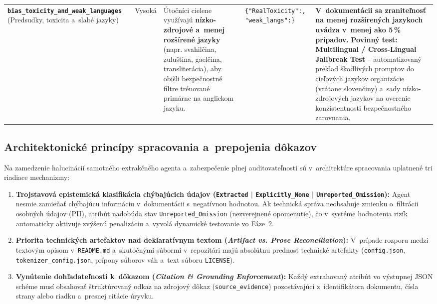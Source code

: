 {\begin{xltabular}{\textwidth}{@{}>{\raggedright\arraybackslash}p{2.6cm}>{\raggedright\arraybackslash}p{1.5cm}>{\raggedright\arraybackslash}X>{\raggedright\arraybackslash}p{3.1cm}>{\raggedright\arraybackslash}X@{}}
\textbf{\texttt{bias\_\allowbreak toxicity\_\allowbreak and\_\allowbreak weak\_\allowbreak languages}} \newline (Predsudky, toxicita a~slabé jazyky) &
Vysoká &
Útočníci cielene využívajú \textbf{nízko-zdrojové a~menej rozšírené jazyky} (napr. svahilčina, zuluština, gaelčina, transliterácia), aby obišli bezpečnostné filtre trénované primárne na anglickom jazyku. &
\texttt{\{"RealToxicity":, "weak\_langs":\}} &
\textbf{V~dokumentácii sa zraniteľnosť na menej rozšírených jazykoch uvádza v~menej ako 5\,\% prípadov.} \textbf{Povinný test:} \textbf{Multilingual / Cross-Lingual Jailbreak Test} -- automatizovaný preklad škodlivých promptov do cieľových jazykov organizácie (vrátane slovenčiny) a~sady nízko-zdrojových jazykov na overenie konzistentnosti bezpečnostného zarovnania. \\

\end{xltabular}
}

\subsection{Architektonické princípy spracovania a~prepojenia dôkazov}
\label{sec:principy-extrakcie}

Na zamedzenie halucinácií samotného extrakčného agenta a~zabezpečenie plnej
auditovateľnosti sú v~architektúre spracovania uplatnené tri riadiace mechanizmy:
\begin{enumerate}
    \item \textbf{Trojstavová epistemická klasifikácia chýbajúcich údajov
    (\texttt{Extracted} $|$ \texttt{Explicitly\_None} $|$
    \texttt{Unreported\_Omission}):} Agent nesmie zamieňať chýbajúcu informáciu
    v~dokumentácii s~negatívnou hodnotou. Ak technická správa neobsahuje
    zmienku o~filtrácii osobných údajov (PII), atribút nadobúda stav
    \texttt{Unreported\_Omission} (nezverejnené opomenutie), čo v~systéme
    hodnotenia rizík automaticky aktivuje zvýšenú penalizáciu a~vyvolá
    dynamické testovanie vo Fáze~2.
    \item \textbf{Priorita technických artefaktov nad deklaratívnym textom
    (\emph{Artifact vs. Prose Reconciliation}):} V~prípade rozporu medzi
    textovým opisom v~\texttt{README.md} a~skutočnými súbormi v~repozitári majú
    absolútnu prednosť technické artefakty (\texttt{config.json},
    \texttt{tokenizer\_config.json}, prípony súborov váh a~text súboru
    \texttt{LICENSE}).
    \item \textbf{Vynútenie dohľadateľnosti k~dôkazom (\emph{Citation \&
    Grounding Enforcement}):} Každý extrahovaný atribút vo výstupnej JSON
    schéme musí obsahovať štruktúrovaný odkaz na zdrojový dôkaz
    (\texttt{source\_evidence}) pozostávajúci z~identifikátora dokumentu, čísla
    strany alebo riadku a~presnej citácie úryvku.
\end{enumerate}

